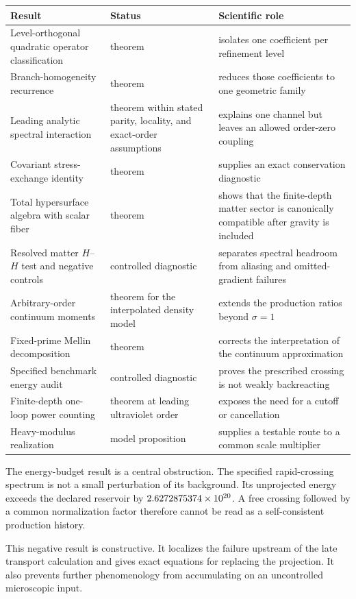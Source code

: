 \begin{longtable}{@{}P{0.36\textwidth}P{0.20\textwidth}P{0.34\textwidth}@{}}
\toprule
Result & Status & Scientific role\\
\midrule
Level-orthogonal quadratic operator classification & theorem & isolates one coefficient per refinement level\\
Branch-homogeneity recurrence & theorem & reduces those coefficients to one geometric family\\
Leading analytic spectral interaction & theorem within stated parity, locality, and exact-order assumptions & explains one channel but leaves an allowed order-zero coupling\\
Covariant stress-exchange identity & theorem & supplies an exact conservation diagnostic\\
Total hypersurface algebra with scalar fiber & theorem & shows that the finite-depth matter sector is canonically compatible after gravity is included\\
Resolved matter $H$--$H$ test and negative controls & controlled diagnostic & separates spectral headroom from aliasing and omitted-gradient failures\\
Arbitrary-order continuum moments & theorem for the interpolated density model & extends the production ratios beyond \(\sigma=1\)\\
Fixed-prime Mellin decomposition & theorem & corrects the interpretation of the continuum approximation\\
Specified benchmark energy audit & controlled diagnostic & proves the prescribed crossing is not weakly backreacting\\
Finite-depth one-loop power counting & theorem at leading ultraviolet order & exposes the need for a cutoff or cancellation\\
Heavy-modulus realization & model proposition & supplies a testable route to a common scale multiplier\\
\bottomrule
\end{longtable}

The energy-budget result is a central obstruction.  The specified rapid-crossing spectrum is not a small perturbation of its background.  Its unprojected energy exceeds the declared reservoir by \(2.6272875374\times 10^{20}\).  A free crossing followed by a common normalization factor therefore cannot be read as a self-consistent production history.

This negative result is constructive.  It localizes the failure upstream of the late transport calculation and gives exact equations for replacing the projection.  It also prevents further phenomenology from accumulating on an uncontrolled microscopic input.

